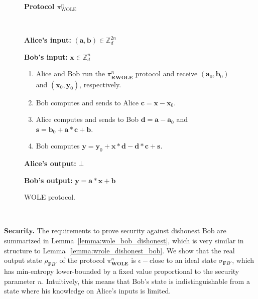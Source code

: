 \begin{figure}[h!]
    \centering
        \begin{tcolorbox}
            
            \centerline{\textbf{Protocol $\mathcal{\pi}^n_{\text{WOLE}}$}}
            
            \
            
    \textbf{Alice's input:} $(\bm{a}, \bm{b})\in \mathbb{Z}^{2n}_d$ 
    
    \textbf{Bob's input:} $\bm{x}\in \mathbb{Z}^{n}_d$

    \begin{enumerate}
        \item Alice and Bob run the $\mathcal{\pi}^n_{\textbf{RWOLE}}$ protocol and receive  $(\bm{a}_0, \bm{b}_0)$ and $(\bm{x}_0, \bm{y}_0)$, respectively.
        \item Bob computes and sends to Alice $\bm{c} = \bm{x} - \bm{x}_0$.
        \item Alice computes and  sends to Bob $\bm{d} = \bm{a} - \bm{a}_0$ and $\bm{s} = \bm{b}_0 + \bm{a} * \bm{c} + \bm{b}$. 
        \item Bob computes $\bm{y} = \bm{y}_0 + \bm{x} * \bm{d} - \bm{d} * \bm{c} + \bm{s}$.
    \end{enumerate}
    

\textbf{Alice's output:} $\bot$

\textbf{Bob's output:} $\bm{y} = \bm{a} * \bm{x} + \bm{b}$
        
        \end{tcolorbox}
\caption{WOLE protocol.}
\label{fig:nOLE}
\end{figure}


\

\noindent\textbf{Security.}  The requirements to prove security against dishonest Bob are summarized in Lemma~\ref{lemma:wole_bob_dishonest}, which is very similar in structure to Lemma~\ref{lemma:wrole_dishonest_bob}. We show that the real output state $\rho_{\mathbf{F} B'}$ of the protocol $\pi^n_{\textbf{WOLE}}$ is $\epsilon-$close to an ideal state $\sigma_{\mathbf{F} B'}$, which has min-entropy lower-bounded by a fixed value proportional to the security parameter $n$. Intuitively, this means that Bob's state is indistinguishable from a state where his knowledge on Alice's inputs is limited.

